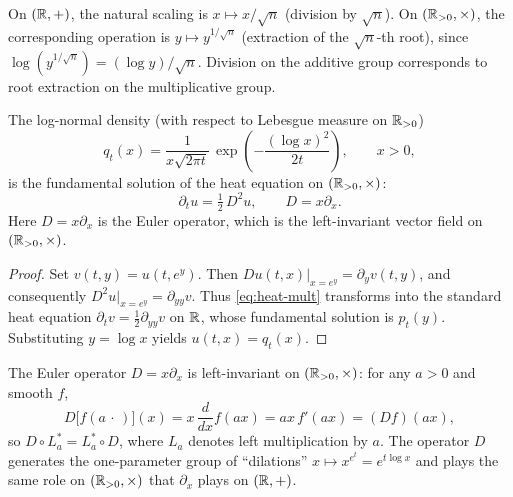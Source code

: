 \begin{remark}[Normalization]\label{rmk:normalization}
On $(\mathbb{R}, +)$, the natural scaling is $x \mapsto x/\sqrt{n}$ (division by $\sqrt{n}$). On $(\mathbb{R}_{>0}, \times)$, the corresponding operation is $y \mapsto y^{1/\sqrt{n}}$ (extraction of the $\sqrt{n}$-th root), since $\log(y^{1/\sqrt{n}}) = (\log y)/\sqrt{n}$. Division on the additive group corresponds to root extraction on the multiplicative group.
\end{remark}

\begin{proposition}\label{prop:heat-mult}
The log-normal density (with respect to Lebesgue measure on $\mathbb{R}_{>0}$)
\[
q_t(x) = \frac{1}{x\sqrt{2\pi t}}\, \exp\!\left(-\frac{(\log x)^2}{2t}\right), \qquad x > 0,
\]
is the fundamental solution of the heat equation on $(\mathbb{R}_{>0}, \times)$:
\begin{equation}\label{eq:heat-mult}
\partial_t u = \tfrac{1}{2}\, D^2 u, \qquad D = x\partial_x.
\end{equation}
Here $D = x\partial_x$ is the Euler operator, which is the left-invariant vector field on $(\mathbb{R}_{>0}, \times)$.
\end{proposition}

\begin{proof}
Set $v(t, y) = u(t, e^y)$. Then $Du(t,x)\big|_{x=e^y} = \partial_y v(t,y)$, and consequently $D^2 u\big|_{x=e^y} = \partial_{yy}v$. Thus \eqref{eq:heat-mult} transforms into the standard heat equation $\partial_t v = \frac{1}{2}\partial_{yy}v$ on $\mathbb{R}$, whose fundamental solution is $p_t(y)$. Substituting $y = \log x$ yields $u(t,x) = q_t(x)$.
\end{proof}

\begin{remark}\label{rmk:euler-invariant}
The Euler operator $D = x\partial_x$ is left-invariant on $(\mathbb{R}_{>0}, \times)$: for any $a > 0$ and smooth $f$,
\[
D\big[f(a\,\cdot\,)\big](x) = x\,\frac{d}{dx}f(ax) = ax\,f'(ax) = (Df)(ax),
\]
so $D \circ L_a^* = L_a^* \circ D$, where $L_a$ denotes left multiplication by $a$. The operator $D$ generates the one-parameter group of ``dilations'' $x \mapsto x^{e^t} = e^{t\log x}$ and plays the same role on $(\mathbb{R}_{>0}, \times)$ that $\partial_x$ plays on $(\mathbb{R}, +)$.
\end{remark}

